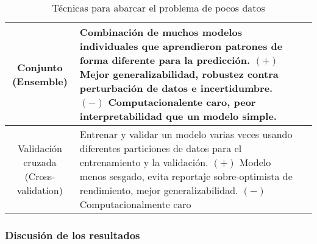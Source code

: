 \begin{center}
\begin{table}[h!]
\begin{tabular}{ |c|m{9.5cm}|c| }
            Conjunto (Ensemble) & Combinación de muchos modelos individuales que aprendieron patrones de forma diferente para la predicción. $(+)$ Mejor generalizabilidad, robustez contra perturbación de datos e incertidumbre. $(-)$ Computacionalente caro, peor interpretabilidad que un modelo simple. & \autocite{safonova-2023,langkvist-2016,pritt-2017} \\
            \hline
            \makecell{Validación cruzada \\ (Cross-validation)} & Entrenar y validar un modelo varias veces usando diferentes particiones de datos para el entrenamiento y la validación. $(+)$ Modelo menos sesgado, evita reportaje sobre-optimista de rendimiento, mejor generalizabilidad. $(-)$ Computacionalmente caro & \autocite{safonova-2023} \\
            \hline
        \end{tabular}
        \caption{Técnicas para abarcar el problema de pocos datos}
        \label{table:3}
    \end{table}
    \vspace{-\topsep}
\end{center}

\subsubsection{Discusión de los resultados}

